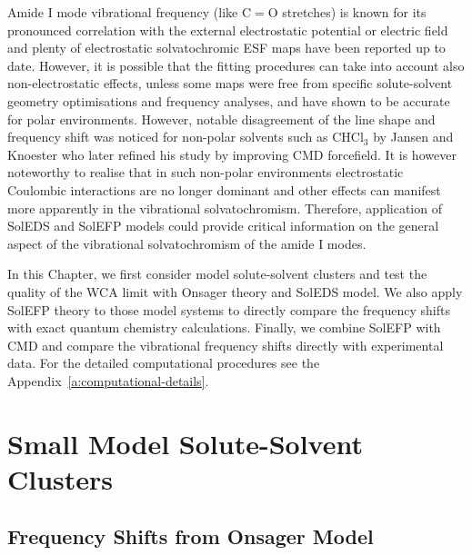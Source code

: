 \documentclass[b5paper,oneside,fleqn,11pt]{book}
\begin{document}
\begin{refsection}
Amide I mode vibrational frequency (like C$=$O stretches) 
is known for its pronounced
correlation with the external electrostatic potential or
electric field and plenty of electrostatic solvatochromic
ESF maps have been reported up to date. \citep{Hayashi.Zhuang.Mukamel.JPCA.2005,Jansen.Knoester.JCP.2006,
Lee.Choi.Cho.JCP.2012,Torii.JCPL.2015}
However, it is possible that the fitting procedures
can take into account also non\hyp{}electrostatic effects,
unless some maps were free from specific solute\hyp{}solvent
geometry optimisations and frequency analyses,
and have shown to be accurate for polar environments. \citep{Hayashi.Zhuang.Mukamel.JPCA.2005,Jansen.Knoester.JCP.2006}
However, notable disagreement of the line shape and frequency shift was noticed for
non\hyp{}polar solvents such as CHCl$_3$ by Jansen and Knoester \citep{Jansen.Knoester.JCP.2006}
who later refined his study by improving CMD forcefield. \citep{Jansen.JPCB.2014}
It is however noteworthy to realise that in such non\hyp{}polar
environments electrostatic Coulombic interactions are no longer
dominant and other effects can manifest more apparently
in the vibrational solvatochromism. Therefore, application of
SolEDS and SolEFP models could provide critical information
on the general aspect of the vibrational solvatochromism of the amide I modes.

In this Chapter, we first consider model solute\hyp{}solvent
clusters and test the quality of the WCA limit with Onsager theory
and SolEDS model.
We also apply SolEFP theory to those model systems
to directly compare the frequency shifts with exact quantum chemistry
calculations. \citep{Blasiak.Lee.Cho.JCP.2013,Blasiak.Cho.JCP.2014,Blasiak.Cho.JCP.2015} 
Finally, we combine SolEFP with CMD and compare the vibrational
frequency shifts directly with experimental data. \citep{Blasiak.Cho.JCP.2015}
For the detailed computational procedures see the Appendix~\ref{a:computational-details}.



\section{Small Model Solute\hyp{}Solvent Clusters}

\subsection{Frequency Shifts from Onsager Model\label{s:amide-I-onsager}}


\end{refsection}
\end{document}
